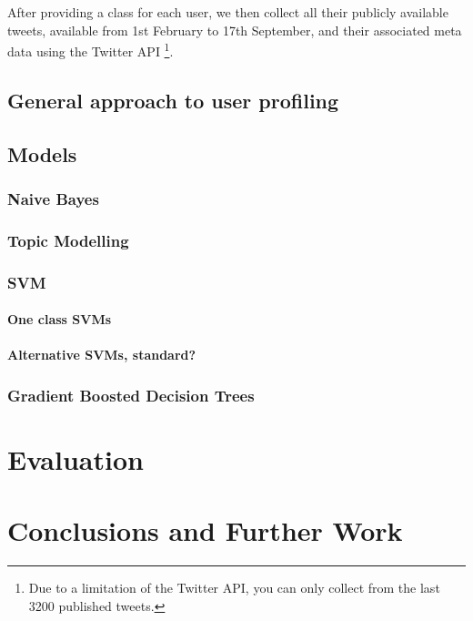\documentclass[bsc,frontabs,singlespacing,parskip]{infthesis}     %
\begin{document}
After providing a class for each user, we then collect all their publicly available tweets, available from 1st February to 17th September, and their associated meta data using the Twitter API \footnote{Due to a limitation of the Twitter API, you can only collect from the last 3200 published tweets.}. 

\section{General approach to user profiling}
\section{Models}
\subsection{Naive Bayes}
\subsection{Topic Modelling}
\subsection{SVM}
\subsubsection{One class SVMs}
\subsubsection{Alternative SVMs, standard?}
\subsection{Gradient Boosted Decision Trees}
\chapter{Evaluation}
\chapter{Conclusions and Further Work}




\end{document}
